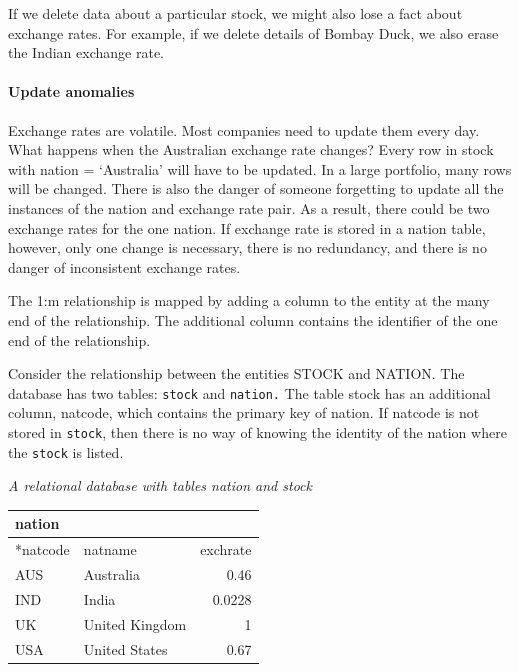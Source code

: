 \documentclass[
]{article}
\begin{document}
If we delete data about a particular stock, we might also lose a fact
about exchange rates. For example, if we delete details of Bombay Duck,
we also erase the Indian exchange rate.

\hypertarget{update-anomalies}{%
\paragraph{Update anomalies}\label{update-anomalies}}

Exchange rates are volatile. Most companies need to update them every
day. What happens when the Australian exchange rate changes? Every row
in stock with nation = `Australia' will have to be updated. In a large
portfolio, many rows will be changed. There is also the danger of
someone forgetting to update all the instances of the nation and
exchange rate pair. As a result, there could be two exchange rates for
the one nation. If exchange rate is stored in a nation table, however,
only one change is necessary, there is no redundancy, and there is no
danger of inconsistent exchange rates.

The 1:m relationship is mapped by adding a column to the entity at the
many end of the relationship. The additional column contains the
identifier of the one end of the relationship.

Consider the relationship between the entities STOCK and NATION. The
database has two tables: \texttt{stock} and \texttt{nation.} The table
stock has an additional column, natcode, which contains the primary key
of nation. If natcode is not stored in \texttt{stock}, then there is no
way of knowing the identity of the nation where the \texttt{stock} is
listed.

\emph{A relational database with tables nation and stock}

\begin{longtable}[]{@{}llr@{}}
\toprule()
nation & & \\
\midrule()
\endhead
*natcode & natname & exchrate \\
AUS & Australia & 0.46 \\
IND & India & 0.0228 \\
UK & United Kingdom & 1 \\
USA & United States & 0.67 \\
\bottomrule()
\end{longtable}
\end{document}
